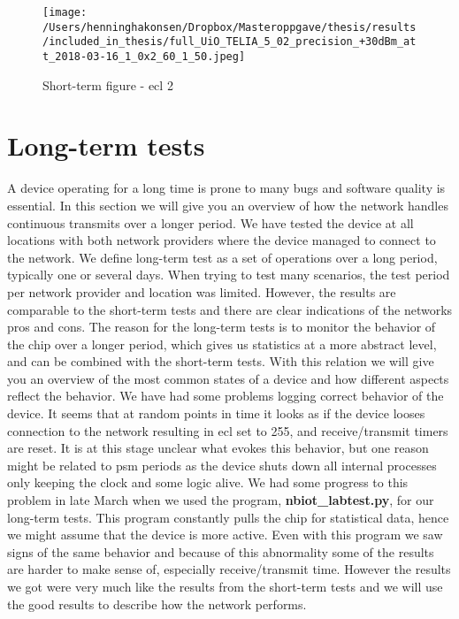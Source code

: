 \documentclass[USenglish]{ifimaster}  %
\begin{document}
\begin{figure}[H]
  \centering
  \texttt{[image: /Users/henninghakonsen/Dropbox/Masteroppgave/thesis/results/included\_in\_thesis/full\_UiO\_TELIA\_5\_02\_precision\_+30dBm\_att\_2018-03-16\_1\_0x2\_60\_1\_50.jpeg]}
  \caption{Short-term figure - \acrshort{ecl} 2}
  \label{figure:1x60_UIO_TELIA_ECL_2}
\end{figure}

\section{Long-term tests} \label{section:longtermtest}
A device operating for a long time is prone to many bugs and software quality is essential. In this section we will give you an overview of how the network handles continuous transmits over a longer period. We have tested the device at all locations with both network providers where the device managed to connect to the network. We define long-term test as a set of operations over a long period, typically one or several days. When trying to test many scenarios, the test period per network provider and location was limited. However, the results are comparable to the short-term tests and there are clear indications of the networks pros and cons. The reason for the long-term tests is to monitor the behavior of the chip over a longer period, which gives us statistics at a more abstract level, and can be combined with the short-term tests. With this relation we will give you an overview of the most common states of a device and how different aspects reflect the behavior. We have had some problems logging correct behavior of the device. It seems that at random points in time it looks as if the device looses connection to the network resulting in \acrshort{ecl} set to 255, and receive/transmit timers are reset. It is at this stage unclear what evokes this behavior, but one reason might be related to \acrshort{psm} periods as the device shuts down all internal processes only keeping the clock and some logic alive. We had some progress to this problem in late March when we used the program, \textbf{nbiot\_labtest.py}, for our long-term tests. This program constantly pulls the chip for statistical data, hence we might assume that the device is more active. Even with this program we saw signs of the same behavior and because of this abnormality some of the results are harder to make sense of, especially receive/transmit time. However the results we got were very much like the results from the short-term tests and we will use the good results to describe how the network performs.
\end{document}
